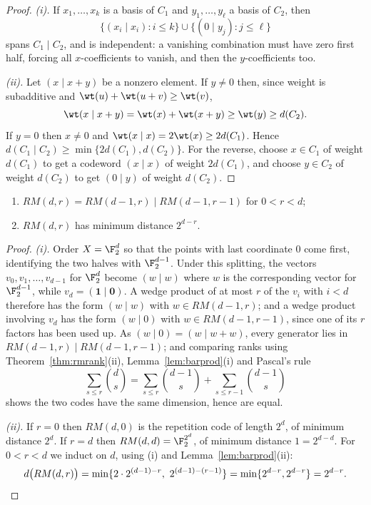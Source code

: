 \begin{proof}
	\emph{(i).} If $x_1,\dots,x_k$ is a basis of $C_1$ and $y_1,\dots,y_\ell$ a basis of $C_2$, then
	$$\{(x_i\mid x_i) : i \le k\}\cup\{(0\mid y_j): j\le\ell\}$$
	spans $C_1\mid C_2$, and is independent: a vanishing combination must have zero first half, forcing all $x$-coefficients to vanish, and then the $y$-coefficients too.

	\emph{(ii).} Let $(x\mid x+y)$ be a nonzero element. If $y \ne 0$ then, since weight is subadditive and $\wt(u)+\wt(u+v)\ge\wt(v)$,
	$$\wt(x\mid x+y) = \wt(x)+\wt(x+y)\ge \wt(y)\ge d(C_2).$$
	If $y = 0$ then $x \ne 0$ and $\wt(x\mid x) = 2\wt(x)\ge 2d(C_1)$. Hence $d(C_1\mid C_2)\ge\min\{2d(C_1),d(C_2)\}$. For the reverse, choose $x\in C_1$ of weight $d(C_1)$ to get a codeword $(x\mid x)$ of weight $2d(C_1)$, and choose $y \in C_2$ of weight $d(C_2)$ to get $(0 \mid y)$ of weight $d(C_2)$.
\end{proof}

\begin{theorem}\label{thm:rmdist}
	\begin{enumerate}[label=(\roman*)]
		\item $RM(d,r) = RM(d-1,r)\mid RM(d-1,r-1)$ for $0 < r< d$;
		\item $RM(d,r)$ has minimum distance $2^{d-r}$.
	\end{enumerate}
\end{theorem}

\begin{proof}
	\emph{(i).} Order $X = \F_2^d$ so that the points with last coordinate $0$ come first, identifying the two halves with $\F_2^{d-1}$. Under this splitting, the vectors $v_0,v_1,\dots,v_{d-1}$ for $\F_2^d$ become $(w\mid w)$ where $w$ is the corresponding vector for $\F_2^{d-1}$, while $v_d = (\mathbf{1}\mid \mathbf 0)$. A wedge product of at most $r$ of the $v_i$ with $i<d$ therefore has the form $(w\mid w)$ with $w \in RM(d-1,r)$; and a wedge product involving $v_d$ has the form $(w\mid 0)$ with $w \in RM(d-1,r-1)$, since one of its $r$ factors has been used up. As $(w \mid 0) = (w \mid w + w)$, every generator lies in $RM(d-1,r)\mid RM(d-1,r-1)$; and comparing ranks using Theorem~\ref{thm:rmrank}(ii), Lemma~\ref{lem:barprod}(i) and Pascal's rule
	$$\sum_{s\le r}\binom ds = \sum_{s \le r}\binom{d-1}{s} + \sum_{s\le r-1}\binom{d-1}{s}$$
	shows the two codes have the same dimension, hence are equal.

	\emph{(ii).} If $r=0$ then $RM(d,0)$ is the repetition code of length $2^d$, of minimum distance $2^d$. If $r=d$ then $RM(d,d) = \F_2^{2^d}$, of minimum distance $1 = 2^{d-d}$. For $0<r<d$ we induct on $d$, using (i) and Lemma~\ref{lem:barprod}(ii):
	$$d\bigl(RM(d,r)\bigr) = \min\{2\cdot2^{(d-1)-r},\ 2^{(d-1)-(r-1)}\} = \min\{2^{d-r},2^{d-r}\} = 2^{d-r}. \qedhere$$
\end{proof}

